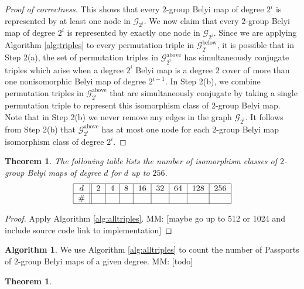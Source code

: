 \documentclass{dcthesis}
\newcommand{\mm}[1]{{\color{blue} \sf MM: [#1]}}
\newtheorem{theorem}[prop]{Theorem}
\theoremstyle{definition}
\newtheorem{alg}[prop]{Algorithm}
\theoremstyle{remark}
\numberwithin{equation}{section}
\numberwithin{figure}{section}
\begin{document}
{{\begin{proof}[Proof of correctness]
      This shows that every $2$-group Belyi map
      of degree $2^i$ is represented by at least one node in
      $\mathscr{G}_{2^i}$.
      We now claim that every $2$-group Belyi map of degree $2^i$
      is represented by exactly one node in $\mathscr{G}_{2^i}$.
      Since we are applying Algorithm \ref{alg:triples}
      to every permutation triple in $\mathscr{G}_{2^i}^\text{below}$,
      it is possible that in Step 2(a),
      the set of permutation triples in $\mathscr{G}_{2^i}^\text{above}$
      has simultaneously conjugate triples
      which arise when a degree $2^i$ Belyi map
      is a degree $2$ cover of more than one
      nonisomorphic Belyi map of degree $2^{i-1}$.
      In Step 2(b),
      we combine permutation triples in $\mathscr{G}_{2^i}^\text{above}$
      that are simultaneously conjugate by taking a single
      permutation triple to represent this isomorphism class
      of $2$-group Belyi map.
      Note that in Step 2(b)
      we never remove any edges in the graph
      $\mathscr{G}_{2^i}$.
      It follows from Step 2(b)
      that $\mathscr{G}_{2^i}^\text{above}$ has at most
      one node for each
      $2$-group Belyi map
      isomorphism class of degree $2^i$.
    \end{proof}
    \begin{theorem}\label{thm:isoclasses}
      The following table lists the number of isomorphism classes of
      $2$-group Belyi maps of degree $d$ for $d$ up to $256$.
      \[
        \begin{tabular}{|c||c|c|c|c|c|c|c|c|}
          \hline
          $d$ & $2$ & $4$ & $8$ & $16$ & $32$ & $64$ & $128$ & $256$\\
          \hline
          \# & $$ & $$ & $$ & $$ & $$ & $$ & $$ & $$\\
          \hline
        \end{tabular}
      \]
    \end{theorem}
    \begin{proof}
      Apply Algorithm \ref{alg:alltriples}.
      \mm{maybe go up to 512 or 1024 and include source code link to implementation}
    \end{proof}
    \begin{alg}\label{alg:allpassports}
      We use Algorithm \ref{alg:alltriples}
      to count the number of Passports of $2$-group Belyi maps
      of a given degree.
      \mm{todo}
    \end{alg}
    \begin{theorem}\label{thm:passports}

\end{theorem}}}
\end{document}
